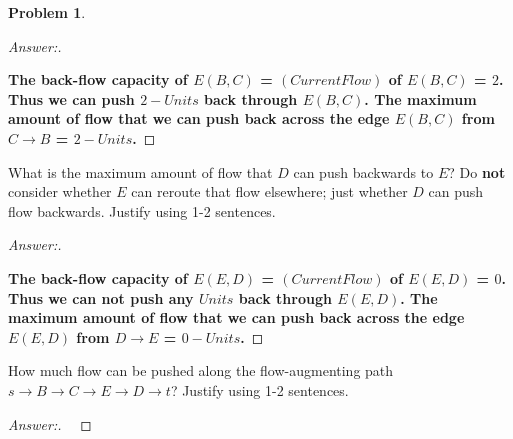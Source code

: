 \documentclass[11pt]{article}
\theoremstyle{definition}
\theoremstyle{definition}
\newtheorem{required}{Problem}
\theoremstyle{definition}
\begin{document}
\begin{required}
\begin{enumerate}[label=(\alph*)]
\begin{proof}[Answer:] \

\item \textbf{The back-flow capacity of $E(B, C)$ = $(Current Flow)$ of $E(B, C)$ = $2$. Thus we can push $2-Units$ back through $E(B, C)$. The maximum amount of flow that we can push back across the edge $E(B, C)$ from $C \to B$ = \color{red}$2-Units$\color{black}.}

\end{proof}


\item What is the maximum amount of flow that $D$ can push backwards to $E$? Do \textbf{not} consider whether $E$ can reroute that flow elsewhere; just whether $D$ can push flow backwards. Justify using 1-2 sentences.

\begin{proof}[Answer:] \

\item \textbf{The back-flow capacity of $E(E, D)$ = $(Current Flow)$ of $E(E, D)$ = $0$. Thus we can not push any $Units$ back through $E(E, D)$. The maximum amount of flow that we can push back across the edge $E(E, D)$ from $D \to E$ = \color{red}$0-Units$\color{black}.}

\end{proof}


\item How much flow can be pushed along the flow-augmenting path $s \to B \to C \to E \to D \to t$? Justify using 1-2 sentences.

\begin{proof}[Answer:] \


\end{proof}
\end{enumerate}
\end{required}
\end{document}
